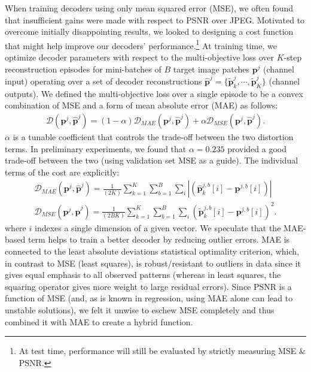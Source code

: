 \documentclass[smallabstract,smallcaptions]{dccpaper}
\begin{document}
When training decoders using only mean squared error (MSE), we often found that insufficient gains were made with respect to PSNR over JPEG. Motivated to overcome initially disappointing results, we looked to designing a cost function that might help improve our decoders' performance.\footnote{At test time, performance will still be evaluated by strictly measuring MSE \& PSNR.} At training time, we optimize decoder parameters with respect to the multi-objective loss over $K$-step reconstruction episodes for mini-batches of $B$ target image patches $\mathbf{p}^j$ (channel input) operating over a set of decoder reconstructions $\widehat{\mathbf{p}}^j = \{ \widetilde{\mathbf{p}}^j_k, \cdots, \widetilde{\mathbf{p}}^j_K \}$ (channel outputs). We defined the multi-objective loss over a single episode to be a convex combination of MSE and a form of mean absolute error (MAE) as follows:
\begin{align}
\mathcal{D}(\mathbf{p}^j,\widehat{\mathbf{p}}^j) = (1 - \alpha) \mathcal{D}_{MAE}(\mathbf{p}^j,\widehat{\mathbf{p}}^j) + \alpha \mathcal{D}_{MSE}(\mathbf{p}^j,\widehat{\mathbf{p}}^j) \mbox{.} \label{cost_function}
\end{align}
$\alpha$ is a tunable coefficient that controls the trade-off between the two distortion terms. In preliminary experiments, we found that $\alpha = 0.235$ provided a good trade-off between the two (using validation set MSE as a guide).
The individual terms of the cost are explicitly:
\begin{align}
\mathcal{D}_{MAE}(\mathbf{p}^j,\widehat{\mathbf{p}}^j) = \frac{1}{(2 K)}  \sum^K_{k=1} \sum^B_{b=1} \sum_i | ( \widehat{\mathbf{p}}^{j,b}_k[i] - \mathbf{p}^{j,b}[i] ) | \label{eqn:mae} \\
\mathcal{D}_{MSE}(\mathbf{p}^j,\widehat{\mathbf{p}}^j) = \frac{1}{(2 B K)}  \sum^K_{k=1} \sum^B_{b=1} \sum_i ( \widetilde{\mathbf{p}}^{j,b}_k[i] - \mathbf{p}^{j,b}[i] )^2 \mbox{.} \label{eqn:mse}
\end{align}
where $i$ indexes a single dimension of a given vector. 
We speculate that the MAE-based term helps to train a better decoder by reducing outlier errors. MAE is connected to the least absolute deviations statistical optimality criterion, which, in contrast to MSE (least squares), is robust/resistant to outliers in data since it gives equal emphasis to all observed patterns (whereas in least squares, the squaring operator gives more weight to large residual errors). Since PSNR is a function of MSE (and, as is known in regression, using MAE alone can lead to unstable solutions), we felt it unwise to eschew MSE completely and thus combined it with MAE to create a hybrid function.
\end{document}
